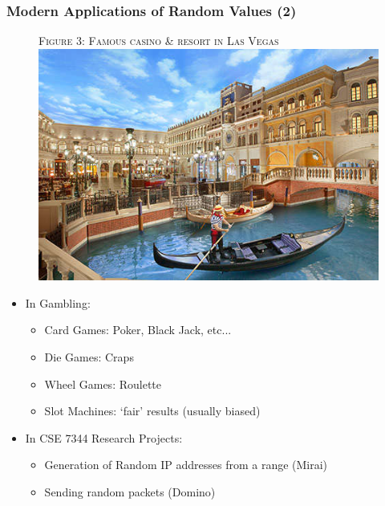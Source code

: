 \documentclass{beamer}
\begin{document}
\begin{frame}
\frametitle{Modern Applications of Random Values (2)}

\begin{figure}
\vspace{-1.5 em}
{\tiny \textsc{Figure 3: Famous casino \& resort in Las Vegas}}\\
\vspace{0.5 em}
\includegraphics[scale = 0.25]{images/ven.jpeg}
\end{figure}
\vspace{-1 em}
\begin{itemize}
	\item In Gambling:
		\begin{itemize}
		\item Card Games: Poker, Black Jack, etc...
		\item Die Games: Craps
		\item Wheel Games: Roulette				
		\item Slot Machines:  `fair' results (usually biased)
	\end{itemize}
	\item In CSE 7344 Research Projects:
	\begin{itemize}
		\item Generation of Random IP addresses from a range (Mirai)
		\item Sending random packets (Domino)
	\end{itemize}
\end{itemize}
\end{frame}
\end{document}
